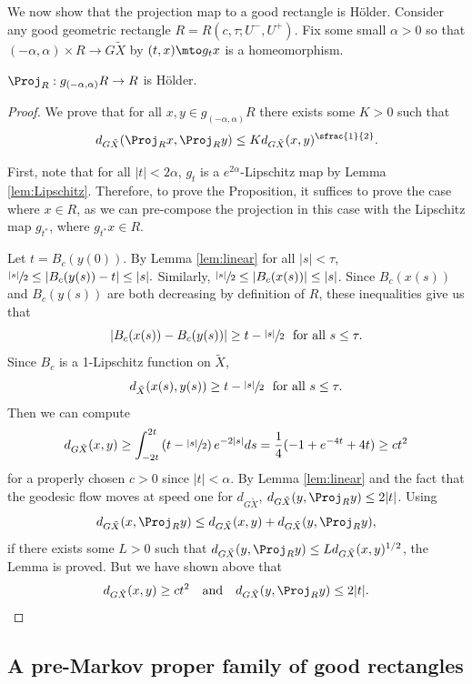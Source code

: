 We now show that the projection map to a good rectangle is Hölder. Consider any good geometric rectangle $R=R(c,\tau; U^-, U^+)$. Fix some small $\alpha>0$ so that $(-\alpha, \alpha) \times R \to G\tilde X$ by $(t,x) \mto g_t x$ is a homeomorphism.

\begin{prop} \label{projholder}
$\Proj_R:g_{(-\alpha, \alpha)}R \to R$ is Hölder.
\end{prop}

\begin{proof}
We prove that for all $x,y\in g_{(-\alpha, \alpha)}R$ there exists some $K>0$ such that
\[ d_{G\tilde X} (\Proj_Rx, \Proj_Ry) \leq K d_{G\tilde X}(x,y)^{\sfrac{1}{2}}.\]

First, note that for all $|t|<2\alpha$, $g_t$ is a $e^{2\alpha}$-Lipschitz map by Lemma \ref{lem:Lipschitz}. Therefore, to prove the Proposition, it suffices to prove the case where $x\in R$, as we can pre-compose the projection in this case with the Lipschitz map $g_{t^*}$, where $g_{t^*}x\in R$.

Let $t=B_c(y(0))$. By Lemma \ref{lem:linear} for all $|s|<\tau$, $\sfrac{|s|}{2} \leq |B_c(y(s))-t| \leq |s|.$ Similarly, $\sfrac{|s|}{2} \leq |B_c(x(s))| \leq |s|$. Since $B_c(x(s))$ and $B_c(y(s))$ are both decreasing by definition of $R$, these inequalities give us that
\[ |B_c(x(s)) - B_c(y(s))| \geq t-\sfrac{|s|}{2} \ \mbox{ for all } s\leq \tau.\]
Since $B_c$ is a 1-Lipschitz function on $\tilde X$,
\[ d_{\tilde X}(x(s), y(s)) \geq t-\sfrac{|s|}{2} \ \mbox{ for all } s\leq \tau. \]
Then we can compute
\[ d_{G\tilde X}(x,y) \geq \int_{-2t}^{2t} \left(t-\sfrac{|s|}{2}\right) e^{-2|s|} ds = \frac{1}{4}(-1+e^{-4t}+4t) \geq c t^2\]
for a properly chosen $c>0$ since $|t|<\alpha$. By Lemma \ref{lem:linear} and the fact that the geodesic flow moves at speed one for $d_{G\tilde X}$, $d_{G\tilde X}(y,\Proj_Ry) \leq 2|t|$. Using
\[
d_{G\tilde X}(x, \Proj_Ry) \leq d_{G\tilde X}(x,y) + d_{G\tilde X}(y,\Proj_Ry),
\]
if there exists some $L>0$ such that $d_{G\tilde X}(y,\Proj_Ry) \leq Ld_{G\tilde X}(x,y)^{1/2}$, the Lemma is proved. But we have shown above that
\[
d_{G\tilde X}(x,y) \geq ct^2\quad\text{and}\quad d_{G\tilde X} (y, \Proj_Ry)\leq 2|t|.\qedhere
\]
\end{proof}

\subsection{A pre-Markov proper family of good rectangles}\label{sec:good markov}

